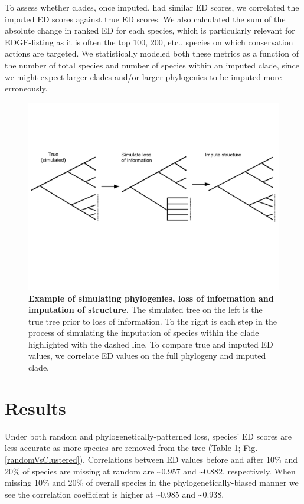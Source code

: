 \documentclass[12pt,english]{article}
\begin{document}
To assess whether clades, once imputed, had similar ED scores, we correlated the
imputed ED scores against true ED scores. We also calculated the sum of the
absolute change in ranked ED for each species, which is particularly relevant
for EDGE-listing as it is often the top 100, 200, etc., species on which
conservation actions are targeted. We statistically modeled both these metrics
as a function of the number of total species and number of species within an
imputed clade, since we might expect larger clades and/or larger phylogenies to
be imputed more erroneously.

\begin{figure}[!ht]
  \center
  \includegraphics[width=.75\textwidth]{imputeConcept.png}
  \caption{\textbf{Example of simulating phylogenies, loss of information and
  imputation of structure.} The simulated tree on the left is the true tree
  prior to loss of information. To the right is each step in the process of
  simulating the imputation of species within the clade highlighted with the
  dashed line. To compare true and imputed ED values, we correlate ED values on
  the full phylogeny and imputed clade.}
  \label{imputeConcept}
\end{figure}

\section*{Results}
Under both random and phylogenetically-patterned loss, species' ED scores are
less accurate as more species are removed from the tree (Table 1; Fig.
\ref{randomVsClustered}). Correlations between ED values before and after 10\%
and 20\% of species are missing at random are \textasciitilde 0.957 and
\textasciitilde 0.882, respectively. When missing 10\% and 20\% of overall
species in the phylogenetically-biased manner we see the correlation coefficient
is higher at \textasciitilde 0.985 and \textasciitilde 0.938.
\end{document}
